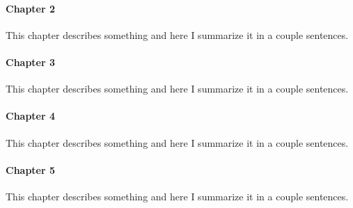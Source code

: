 \paragraph{Chapter 2} This chapter describes something and here I summarize it in a couple sentences.

\paragraph{Chapter 3} This chapter describes something and here I summarize it in a couple sentences.

\paragraph{Chapter 4} This chapter describes something and here I summarize it in a couple sentences.

\paragraph{Chapter 5} This chapter describes something and here I summarize it in a couple sentences.

\clearpage %